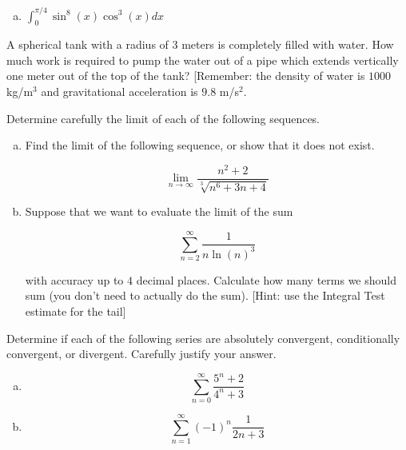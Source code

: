 \documentclass[11pt]{exam}
\theoremstyle{definition}
\begin{document}
\begin{questions}
\begin{enumerate}[(a)]
\vspace{4in}
\item $\int_0^{\pi/4} \sin^8(x)\cos^3(x)dx$

\end{enumerate}

\newpage
\question[10]\mbox{} 

A spherical tank with a radius of $3$ meters is completely filled with water.  How much work is required to pump the water out of a pipe which extends vertically one meter out of the top of the tank?  [Remember: the density of water is $1000$ kg/m$^3$ and gravitational acceleration is $9.8$ m/s$^2$.

\newpage
\question[10]\mbox{} 

Determine carefully the limit of each of the following sequences.

\begin{enumerate}[(a)]

\item

Find the limit of the following sequence, or show that it does not exist.

$$\lim_{n\rightarrow\infty} \frac{n^2+2}{\sqrt[3]{n^6+3n+4}}$$

\vspace{3in}
\item

Suppose that we want to evaluate the limit of the sum 

$$\sum_{n=2}^\infty \frac{1}{n\ln(n)^3}$$

with accuracy up to $4$ decimal places.  Calculate how many terms we should sum (you don't need to actually do the sum).  [Hint: use the Integral Test estimate for the tail]

\end{enumerate}


\newpage
\question[10]\mbox{} 

Determine if each of the following series are absolutely convergent, conditionally convergent, or divergent.
Carefully justify your answer.

\begin{enumerate}[(a)]
\item  $$\sum_{n=0}^\infty \frac{5^n+2}{4^{n}+3}$$
\vspace{3in}
\item  $$\sum_{n=1}^\infty (-1)^n\frac{1}{2n+3}$$
\end{enumerate}

\newpage
\question[10]\mbox{} 


\end{questions}
\end{document}
